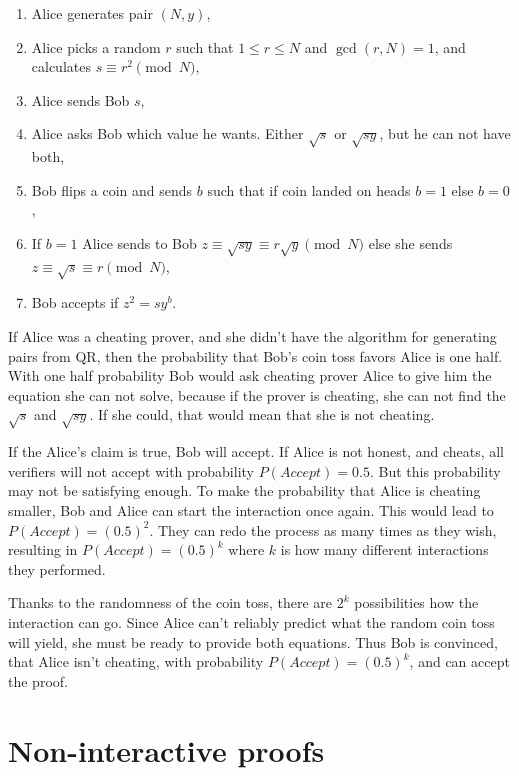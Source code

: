 \begin{enumerate}
    \item Alice generates pair $(N, y)$,
    \item Alice picks a random $r$ such that $1 \leq r \leq N$ and $\gcd(r, N) = 1$,
          and calculates $s \equiv r^2 \pmod{N}$,
    \item Alice sends Bob $s$,
    \item Alice asks Bob which value he wants. Either $\sqrt{s}$ or $\sqrt{sy}$, but he can not have both,
    \item Bob flips a coin and sends $b$ such that if coin landed on heads $b = 1$ else $b = 0$,
    \item If $b = 1$ Alice sends to Bob $z \equiv \sqrt{sy} \equiv r \sqrt{y} \pmod{N}$ else she sends $z \equiv \sqrt{s} \equiv r \pmod{N}$,
    \item Bob accepts if $z^2 = sy^b$.
\end{enumerate}

If Alice was a cheating prover, and she didn't have the algorithm for
generating pairs from QR, then the probability that Bob's coin toss favors
Alice is one half. With one half probability Bob would ask cheating prover
Alice to give him the equation she can not solve, because if the prover is
cheating, she can not find the $\sqrt{s}$ and $\sqrt{sy}$. If she could,
that would mean that she is not cheating.

If the Alice's claim is true, Bob will accept. If Alice is not honest, and
cheats, all verifiers will not accept with probability $P(Accept) = 0.5$.
But this probability may not be satisfying enough. To make the probability
that Alice is cheating smaller, Bob and Alice can start the interaction once
again. This would lead to $P(Accept) = (0.5)^2$. They can redo the process
as many times as they wish, resulting in $P(Accept) = (0.5)^k$ where $k$
is how many different interactions they performed.

Thanks to the randomness of the coin toss, there are $2^k$ possibilities how
the interaction can go. Since Alice can't reliably predict what the random
coin toss will yield, she must be ready to provide both equations. Thus Bob is
convinced, that Alice isn't cheating, with probability $P(Accept) = (0.5)^k$,
and can accept the proof.

\section{Non-interactive proofs}

